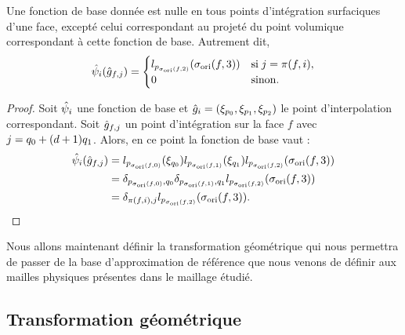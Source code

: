 \begin{proposition} \label{prop:projection_face}
	Une fonction de base donnée est nulle en tous points d’intégration
	surfaciques d'une face, excepté celui correspondant au projeté du point
	volumique correspondant à cette fonction de base. Autrement dit,
	\begin{equation}
		\hat{\psi}_{i}(\hat{g}_{f,j}) =
		\begin{cases}
			l_{p_{\sigma_{\mathrm{ori}}(f,2)}}(\sigma_{\mathrm{ori}}(f,3)) & \mathrm{si} \; j = \pi(f,i) , \\
			0 & \mathrm{sinon} .
		\end{cases}
	\end{equation}
\end{proposition}

\begin{proof}
	Soit $\hat{\psi}_{i}$ une fonction de base et $\hat{g}_{i}
	= \left(\xi_{p_{0}},\xi_{p_{1}},\xi_{p_{2}}\right)$ le point
	d'interpolation correspondant.
	Soit $\hat{g}_{f,j}$ un point d’intégration sur la face $f$ avec
	$j = {q_{0}} + (d + 1){q_{1}}$.
	Alors, en ce point la fonction de base vaut :
	\begin{equation}
		\begin{aligned}
			\hat{\psi}_{i}(\hat{g}_{f,j}) &=
			l_{p_{\sigma_{\mathrm{ori}}(f,0)}}(\xi_{q_{0}})
			l_{p_{\sigma_{\mathrm{ori}}(f,1)}}(\xi_{q_{1}})
			l_{p_{\sigma_{\mathrm{ori}}(f,2)}}(\sigma_{\mathrm{ori}}(f,3)) \\
			&= \delta_{{p_{\sigma_{\mathrm{ori}}(f,0)}},{q_{0}}}
			\delta_{{p_{\sigma_{\mathrm{ori}}(f,1)}},{q_{1}}}
			l_{p_{\sigma_{\mathrm{ori}}(f,2)}}(\sigma_{\mathrm{ori}}(f,3)) \\
			&= \delta_{\pi(f,i),j}
			l_{p_{\sigma_{\mathrm{ori}}(f,2)}}(\sigma_{\mathrm{ori}}(f,3)) .
		\end{aligned}
	\end{equation}
\end{proof}


Nous allons maintenant définir la transformation géométrique
qui nous permettra de passer de la base d'approximation de référence
que nous venons de définir aux mailles physiques présentes dans le maillage étudié.
\\


\subsection{Transformation géométrique}
\label{ssect:transformation_geometrique}


